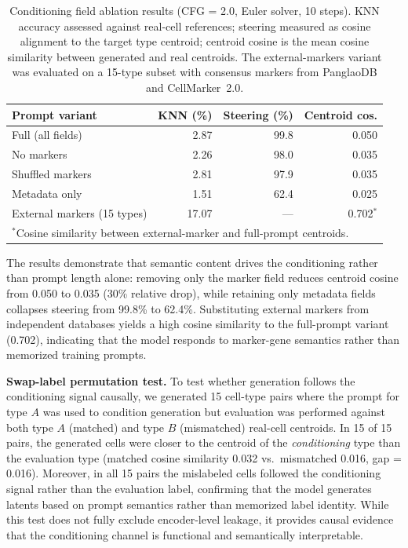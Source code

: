 \documentclass[preprint,12pt]{elsarticle}
\begin{document}
\begin{table}[htbp]
\centering
\caption{Conditioning field ablation results (CFG = 2.0, Euler solver, 10 steps). KNN accuracy assessed against real-cell references; steering measured as cosine alignment to the target type centroid; centroid cosine is the mean cosine similarity between generated and real centroids. The external-markers variant was evaluated on a 15-type subset with consensus markers from PanglaoDB and CellMarker~2.0.\label{tab:cond-ablation}}
\begin{tabular}{lrrr}
\toprule
Prompt variant & KNN (\%) & Steering (\%) & Centroid cos. \\
\midrule
Full (all fields) & 2.87 & 99.8 & 0.050 \\
No markers & 2.26 & 98.0 & 0.035 \\
Shuffled markers & 2.81 & 97.9 & 0.035 \\
Metadata only & 1.51 & 62.4 & 0.025 \\
External markers (15 types) & 17.07 & --- & 0.702$^*$ \\
\bottomrule
\multicolumn{4}{l}{\footnotesize $^*$Cosine similarity between external-marker and full-prompt centroids.}
\end{tabular}
\end{table}

The results demonstrate that semantic content drives the conditioning rather than prompt length alone: removing only the marker field reduces centroid cosine from 0.050 to 0.035 (30\% relative drop), while retaining only metadata fields collapses steering from 99.8\% to 62.4\%. Substituting external markers from independent databases yields a high cosine similarity to the full-prompt variant (0.702), indicating that the model responds to marker-gene semantics rather than memorized training prompts.

\textbf{Swap-label permutation test.} To test whether generation follows the conditioning signal causally, we generated 15 cell-type pairs where the prompt for type $A$ was used to condition generation but evaluation was performed against both type $A$ (matched) and type $B$ (mismatched) real-cell centroids. In 15 of 15 pairs, the generated cells were closer to the centroid of the \emph{conditioning} type than the evaluation type (matched cosine similarity 0.032 vs.\ mismatched 0.016, gap = 0.016). Moreover, in all 15 pairs the mislabeled cells followed the conditioning signal rather than the evaluation label, confirming that the model generates latents based on prompt semantics rather than memorized label identity. While this test does not fully exclude encoder-level leakage, it provides causal evidence that the conditioning channel is functional and semantically interpretable.
\end{document}
